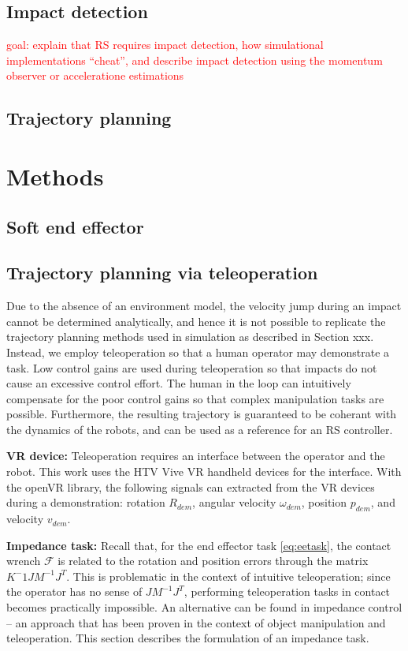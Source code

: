 \documentclass[a4paper, 10pt, conference]{ieeeconf}
\begin{document}
    \subsection{Impact detection}
    \textcolor{red}{goal: explain that RS requires impact detection, how simulational implementations ``cheat'', and describe impact detection using the momentum observer or acceleratione estimations}\\
    \subsection{Trajectory planning}

    \section{Methods}
    \subsection{Soft end effector}

    \subsection{Trajectory planning via teleoperation}
    Due to the absence of an environment model, the velocity jump during an impact cannot be determined analytically, and hence it is not possible to replicate the trajectory planning methods used in simulation as described in Section xxx. Instead, we employ teleoperation so that a human operator may demonstrate a task. Low control gains are used during teleoperation so that impacts do not cause an excessive control effort. The human in the loop can intuitively compensate for the poor control gains so that complex manipulation tasks are possible. Furthermore, the resulting trajectory is guaranteed to be coherant with the dynamics of the robots, and can be used as a reference for an RS controller.

    \textbf{VR device:} Teleoperation requires an interface between the operator and the robot. This work uses the HTV Vive VR handheld devices for the interface. With the openVR library, the following signals can extracted from the VR devices during a demonstration: rotation $R_{dem}$, angular velocity $\omega_{dem}$, position $p_{dem}$, and velocity $v_{dem}$.

    \textbf{Impedance task:} Recall that, for the end effector task \eqref{eq:eetask}, the contact wrench $\mathcal{F}$ is related to the rotation and position errors through the matrix $K^-1JM^{-1}J^T$. This is problematic in the context of intuitive teleoperation; since the operator has no sense of $JM^{-1}J^T$, performing teleoperation tasks in contact becomes practically impossible. An alternative can be found in impedance control -- an approach that has been proven in the context of object manipulation and teleoperation. This section describes the formulation of an impedance task.
\end{document}
